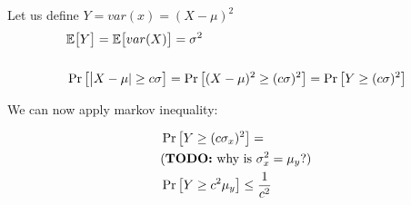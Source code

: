 Let us define $Y = var(x) = (X - \mu)^2$
\begin{align*}
    &\mathbb{E}\big[ Y \big] = \mathbb{E}\big[ var(X) \big] = \sigma^2 \\
    \\
    &\Pr \big[ \big| X - \mu| \geq c \sigma \big] = 
    \Pr \big[ (X - \mu)^2 \geq (c \sigma)^2 \big] = 
    \Pr \big[ Y \geq (c \sigma)^2 \big]
\end{align*}

We can now apply markov inequality:

\begin{align*}
    &\Pr \big[ Y \geq (c \sigma_x)^2 \big] =  \\
    &\text{(\textbf{TODO:} why is $\sigma_x^2 = \mu_y$?)}  \\
    &\Pr \big[ Y \geq c^2 \mu_y \big] \leq \frac{1}{c^2}
\end{align*}




